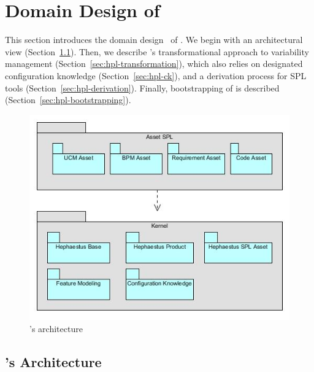 
\section{Domain Design of \hpl}
\label{sec:domainDesign}

This section introduces the domain design~\cite{gpbook} of \hpl. We begin with an architectural view (Section~\ref{sec:hpl-architecture}). Then, we describe \hpl's transformational approach to variability management (Section~\ref{sec:hpl-transformation}), which also relies on designated configuration knowledge (Section~\ref{sec:hpl-ck}), and a derivation process for SPL tools (Section~\ref{sec:hpl-derivation}).  Finally, bootstrapping of \hpl{} is described (Section~\ref{sec:hpl-bootstrapping}).


\begin{figure}[t!]
\begin{center}
\includegraphics[width=.9\textwidth]{imagens/architecture-hpl-vf.jpg}
\end{center}
\caption{\hpl's architecture}
\label{fig:hpl-architecture}
\end{figure}


\subsection{\hpl's Architecture} 
\label{sec:hpl-architecture}

